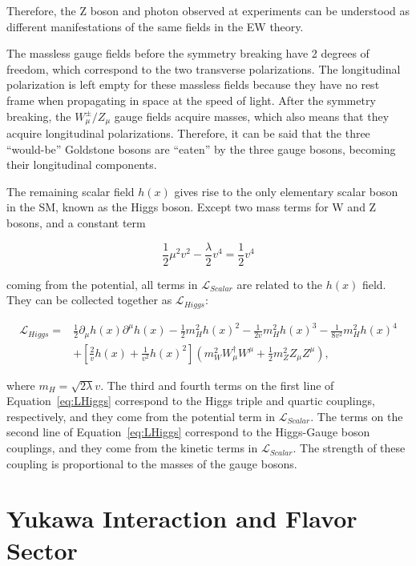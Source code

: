 Therefore, the Z boson and photon observed at experiments can be understood as different manifestations of the same fields in the \ac{EW} theory. 

The massless gauge fields before the symmetry breaking have 2 degrees of freedom, which correspond to the two transverse polarizations. The longitudinal polarization is left empty for these massless fields because they have no rest frame when propagating in space at the speed of light. After the symmetry breaking, the $W^{\pm}_{\mu}/Z_{\mu}$ gauge fields acquire masses, which also means that they acquire longitudinal polarizations. Therefore, it can be said that the three ``would-be'' Goldstone bosons are ``eaten'' by the three gauge bosons, becoming their longitudinal components.

The remaining scalar field $h(x)$ gives rise to the only elementary scalar boson in the \ac{SM}, known as the Higgs boson. Except two mass terms for W and Z bosons, and a constant term 

\begin{equation}
\frac{1}{2}\mu^2v^2-\frac{\lambda}{2}v^4=\frac{1}{2}v^4
\end{equation}

coming from the potential, all terms in $\mathcal{L}_{Scalar}$ are related to the $h(x)$ field. They can be collected together as $\mathcal{L}_{Higgs}$:

\begin{equation}
\label{eq:LHiggs}
\begin{split}
\mathcal{L}_{Higgs}=&\frac{1}{2}\partial_{\mu}h(x)\partial^{\mu}h(x)-\frac{1}{2}m_{H}^2h(x)^2-\frac{1}{2v}m_{H}^2h(x)^3-\frac{1}{8v^2}m_{H}^2h(x)^4\\
&+[\frac{2}{v}h(x)+\frac{1}{v^2}h(x)^2](m_{W}^2W_{\mu}^{\dagger}W^{\mu}+\frac{1}{2}m_{Z}^2Z_{\mu}Z^{\mu}),
\end{split}
\end{equation}

where $m_{H}=\sqrt{2\lambda}v$. The third and fourth terms on the first line of Equation~\ref{eq:LHiggs} correspond to the Higgs triple and quartic couplings, respectively, and they come from the potential term in $\mathcal{L}_{Scalar}$. The terms on the second line of Equation~\ref{eq:LHiggs} correspond to the Higgs-Gauge boson couplings, and they come from the kinetic terms in $\mathcal{L}_{Scalar}$. The strength of these coupling is proportional to the masses of the gauge bosons. 

\section{Yukawa Interaction and Flavor Sector}
\label{sec:Flavor}

